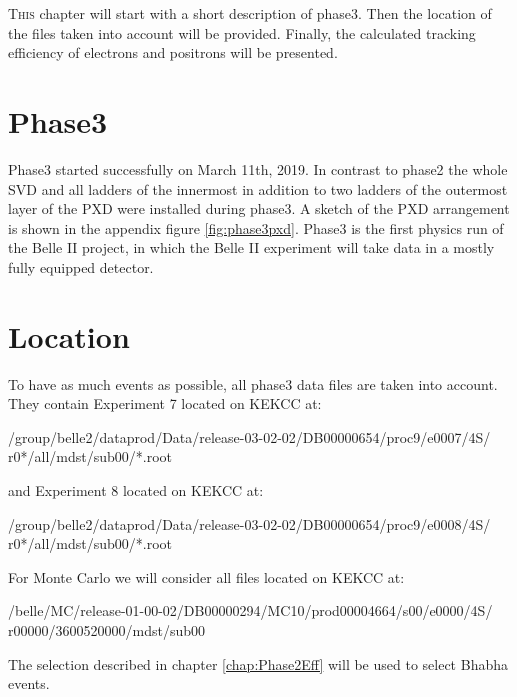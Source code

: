 \documentclass[a4paper,11pt,twosided,final,german,openbib,pdftex,listof=totoc,bibliography=totoc]{scrbook}
\begin{document}
\lettrine{T}{his} chapter will start with a short description of phase3. Then the location of the files taken into account will be provided. Finally, the calculated tracking efficiency of electrons and positrons will be presented.

\section{Phase3}
\label{sec:P3}

Phase3 started successfully on March 11th, 2019. In contrast to phase2 the whole SVD and all ladders of the innermost in addition to two ladders of the outermost layer of the PXD were installed during phase3. A sketch of the PXD arrangement is shown in the appendix figure \ref{fig:phase3pxd}. Phase3 is the first physics run of the Belle II project, in which the Belle II experiment will take data in a mostly fully equipped detector.\cite{phase3}



\section{Location}

To have as much events as possible, all phase3 data files are taken into account. They contain Experiment 7 located on KEKCC at:
\newline

/group/belle2/dataprod/Data/release-03-02-02/DB00000654/proc9/e0007/4S/
r0*/all/mdst/sub00/*.root
\newline 

and Experiment 8 located on KEKCC at:
\newline

/group/belle2/dataprod/Data/release-03-02-02/DB00000654/proc9/e0008/4S/
r0*/all/mdst/sub00/*.root
\newline


For Monte Carlo we will consider all files located on KEKCC at:



/belle/MC/release-01-00-02/DB00000294/MC10/prod00004664/s00/e0000/4S/
r00000/3600520000/mdst/sub00
\newline

The selection described in chapter \ref{chap:Phase2Eff} will be used to select Bhabha events.
\end{document}
